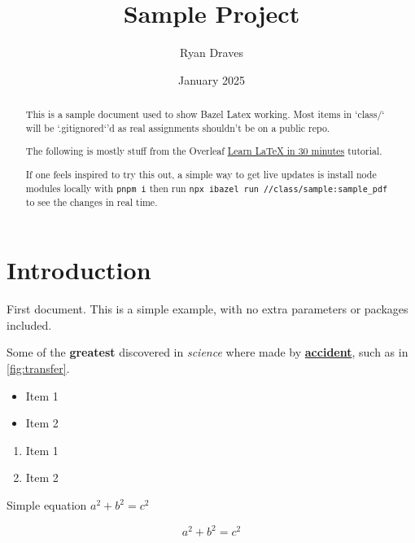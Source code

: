\documentclass[12pt, letterpaper]{article}
\title{Sample Project}
\author{Ryan Draves}
\date{January 2025}
\begin{document}
\maketitle

\begin{abstract}
This is a sample document used to show Bazel Latex working. Most items in `class/` will be `.gitignored`'d as real assignments shouldn't be on a public repo.

The following is mostly stuff from the Overleaf \href{https://www.overleaf.com/learn/latex/Learn_LaTeX_in_30_minutes}{Learn LaTeX in 30 minutes} tutorial.

If one feels inspired to try this out, a simple way to get live updates is install node modules locally with \texttt{pnpm i} then run \texttt{npx ibazel run //class/sample:sample\_pdf} to see the changes in real time.
\end{abstract}

\section{Introduction}
\label{sec:intro}
First document. This is a simple example, with no
extra parameters or packages included.

Some of the \textbf{greatest} discovered in \textit{science} where made by \textbf{\underline{accident}}, such as in \autoref{fig:transfer}.

\begin{itemize}
    \item Item 1
    \item Item 2
\end{itemize}

\begin{enumerate}
    \item Item 1
    \item Item 2
\end{enumerate}

Simple equation $a^2 + b^2 = c^2$

\begin{equation}
    a^2 + b^2 = c^2
    \label{eq:py}
\end{equation}
\end{document}
